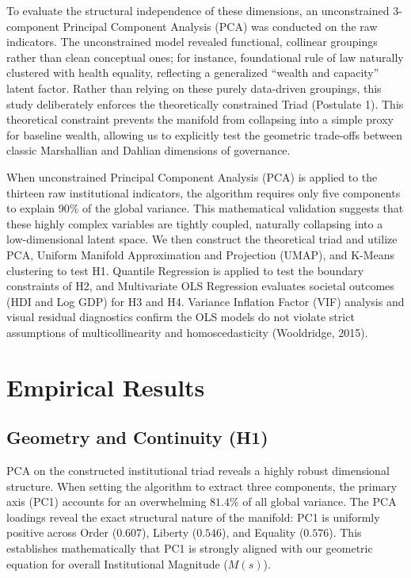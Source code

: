 \documentclass[12pt]{article}
\begin{document}
To evaluate the structural independence of these dimensions, an unconstrained 3-com\-po\-nent Principal Component Analysis (PCA) was conducted on the raw indicators. The unconstrained model revealed functional, collinear groupings rather than clean conceptual ones; for instance, foundational rule of law naturally clustered with health equality, reflecting a generalized ``wealth and capacity'' latent factor. Rather than relying on these purely data-driven groupings, this study deliberately enforces the theoretically constrained Triad (Postulate 1). This theoretical constraint prevents the manifold from collapsing into a simple proxy for baseline wealth, allowing us to explicitly test the geometric trade-offs between classic Mar\-shal\-li\-an and Dah\-li\-an dimensions of governance.

When unconstrained Principal Component Analysis (PCA) is applied to the thirteen raw institutional indicators, the algorithm requires only five components to explain 90\% of the global variance. This mathematical validation suggests that these highly complex variables are tightly coupled, naturally collapsing into a low-dimensional latent space. We then construct the theoretical triad and utilize PCA, Uniform Manifold Approximation and Projection (UMAP), and K-Means clustering to test H1. Quantile Regression is applied to test the boundary constraints of H2, and Multivariate OLS Regression evaluates societal outcomes (HDI and Log GDP) for H3 and H4. Variance Inflation Factor (VIF) analysis and visual residual diagnostics confirm the OLS models do not violate strict assumptions of multicollinearity and homoscedasticity (Wooldridge, 2015).

\section{Empirical Results}

\subsection{Geometry and Continuity (H1)}

PCA on the constructed institutional triad reveals a highly robust dimensional structure. When setting the algorithm to extract three components, the primary axis (PC1) accounts for an overwhelming $81.4\%$ of all global variance. The PCA loadings reveal the exact structural nature of the manifold: PC1 is uniformly positive across Order ($0.607$), Liberty ($0.546$), and Equality ($0.576$). This establishes mathematically that PC1 is strongly aligned with our geometric equation for overall Institutional Magnitude ($M(s)$).
\end{document}
